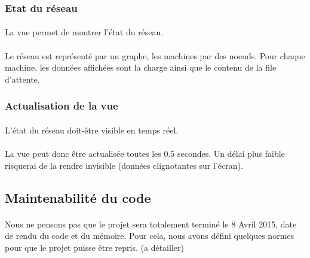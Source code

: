 \documentclass[12pt]{article}
\begin{document}
\subsubsection{Etat du réseau}

\paragraph{} La vue permet de montrer l'état du réseau.

\paragraph{} Le réseau est représenté par un graphe, les machines par des noeuds. 
Pour chaque machine, les données affichées sont la charge ainsi que le contenu de la file d'attente.


\subsubsection{Actualisation de la vue}

\paragraph{} L'état du réseau doit-être visible en temps réel.

\paragraph{} La vue peut donc être actualisée toutes les $0.5$ secondes. 
Un délai plus faible risquerai de la rendre invisible (données clignotantes sur l'écran).


\subsection{Maintenabilité du code}

\paragraph{} Nous ne pensons pas que le projet sera totalement terminé le 8 Avril 2015, date de rendu du code et du mémoire.
Pour cela, nous avons défini quelques normes pour que le projet puisse être repris. (a détailler)

\paragraph{}
\end{document}
